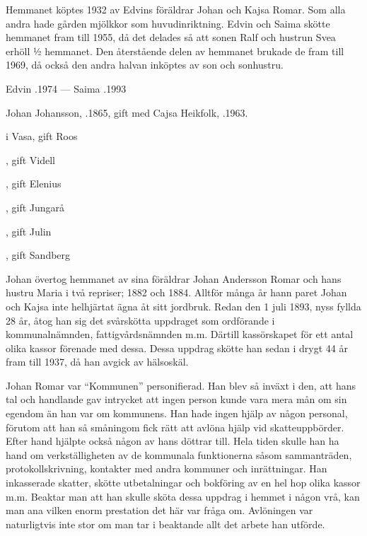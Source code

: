 Hemmanet köptes  1932  av Edvins föräldrar Johan och Kajsa Romar. Som alla andra hade gården mjölkkor som huvudinriktning. Edvin och Saima skötte hemmanet fram till 1955, då det delades så att sonen Ralf och hustrun Svea erhöll ½ hemmanet.  Den återstående delen av hemmanet brukade de fram till 1969, då också den andra halvan inköptes av son och sonhustru.

Edvin .1974  ---  Saima .1993


%
Johan Johansson, .1865, gift med Cajsa Heikfolk, .1963.
\begin{jhchildren}
  \item {} i Vasa, gift Roos
  \item {}, gift Videll
  \item {}, gift Elenius
  \item {}, gift Jungarå
  \item {}
  \item {}, gift Julin
  \item {}, gift Sandberg
\end{jhchildren}
Johan övertog hemmanet av sina föräldrar Johan Andersson Romar och hans hustru Maria i två repriser;  1882 och 1884. Alltför många år hann paret Johan och Kajsa inte helhjärtat ägna åt sitt jordbruk. Redan den 1 juli 1893, nyss fyllda 28 år, åtog han sig det svårskötta uppdraget som ordförande i kommunalnämnden, fattigvårdsnämnden m.m. Därtill kassörskapet för ett antal olika kassor förenade med dessa. Dessa uppdrag skötte han sedan i drygt 44 år fram till 1937, då han avgick av hälsoskäl.

Johan Romar var ``Kommunen'' personifierad. Han blev så inväxt i den, att hans tal och handlande gav intrycket att ingen person kunde vara mera mån om sin egendom än han var om kommunens. Han hade ingen hjälp av någon personal, förutom  att han så småningom fick rätt att avlöna hjälp vid skatteuppbörder. Efter hand hjälpte också någon av hans döttrar till. Hela tiden skulle han ha hand om verkställigheten av de kommunala funktionerna såsom sammanträden, protokollskrivning, kontakter med andra kommuner och inrättningar. Han inkasserade skatter, skötte utbetalningar och bokföring av en hel hop olika kassor m.m. Beaktar man att han skulle sköta dessa uppdrag i hemmet i någon vrå, kan man ana vilken enorm prestation det här var fråga om. Avlöningen var naturligtvis inte stor om man tar i beaktande allt det arbete han utförde.

